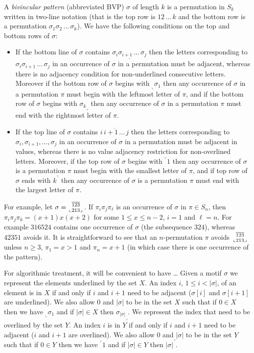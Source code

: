 \documentclass[a4paper]{llncs}
\newcommand{\pmotif}{\sigma}
\newcommand\BV[2]{\genfrac{}{}{0pt}{}{#1}{#2}}
\newcommand{\x}{X}
\newcommand{\y}{Y}
\begin{document}
A \emph{bivincular pattern} (abbreviated BVP) $\sigma$
of length $k$ is a permutation in $S_k$ written in
two-line notation
(that is the top row is $12\,\ldots\,k$ and the bottom row
is a permutation $\sigma_1\sigma_2\,\ldots\,\sigma_k$).
We have the following conditions on the top and bottom rows
of $\sigma$:
\begin{itemize}
	\item
	If the bottom line of $\sigma$ contains
	$\underline{\sigma_i\sigma_{i+1}\,\ldots\,\sigma_j}$
	then the letters corresponding to
	$\sigma_i\sigma_{i+1}\,\ldots\,\sigma_j$ in an occurrence of
	$\sigma$ in a permutation must be adjacent, whereas there is
	no adjacency condition for
	non-underlined consecutive letters.
	Moreover if the bottom row of $\sigma$ begins with
	$_\llcorner{\sigma_1}$ then any occurrence of $\sigma$
	in a permutation $\pi$ must begin with the leftmost
	letter of $\pi$,
	and
	if the bottom row of $\sigma$ begins with
	${\sigma_k}_\lrcorner$ then any occurrence of $\sigma$
	in a permutation $\pi$ must end with the rightmost
	letter of $\pi$.
	\item
	If the top line of $\sigma$ contains
	$\overline{i\,i+1\,\ldots\,j}$ then the letters corresponding to
	$\sigma_i, \sigma_{i+1}, \ldots, \sigma_j$ in an
	occurrence of $\sigma$ in a permutation must be adjacent in values,
	whereas there is no value adjacency restriction for non-overlined
	letters.
	Moreover, if the top row of $\sigma$ begins with
	$^\ulcorner{1}$ then
	any occurrence of $\sigma$ is a permutation $\pi$ must begin with
	the smallest letter of $\pi$, and
	if top row of $\sigma$ ends with $k^\urcorner$ then
	any occurrence of $\sigma$ is a permutation $\pi$ must end with
	the largest letter of $\pi$.
\end{itemize}

For example,
let
$\sigma = \BV{\overline{123}}{\llcorner 213 \lrcorner}$.
If $\pi_i\pi_j\pi_\ell$ is an occurrence of $\sigma$ in $\pi \in S_n$,
then $\pi_i\pi_j\pi_k = (x+1)x(x+2)$ for some $1 \leq x \leq n-2$,
$i=1$ and $\ell = n$.
For example $316524$ contains one occurrence of $\sigma$ (the subsequence $324$),
whereas $42351$ avoids it.
It is straightforward to see that an $n$-permutation
$\pi$ avoids $\BV{\overline{123}}{\llcorner 213 \lrcorner}$ unless
$n \geq 3$,
$\pi_1 = x > 1$
and $\pi_n = x+1$
(in which case there is one occurrence of the pattern).

For algorithmic treatment, it will be convenient to have \ldots
Given a motif $\pmotif$ we represent the elements underlined by the set $\x$. An index $i$, $1 \leq i < |\sigma|$, of an element is in $\x$ if and only if $i$ and $i+1$ need to be adjacent ($\pmotif[i]$ and $\pmotif[i+1]$ are underlined). We also allow $0$ and $|\sigma|$ to be in the set $\x$ such that if $0 \in \x$ then we have $_\llcorner{\sigma_1}$ and if $|\sigma| \in \x$ then ${\sigma_{|\sigma|}}_\lrcorner$.
We represent the index that need to be overlined by the set $\y$. An index $i$ is in $\y$ if and only if $i$ and $i+1$ need to be adjacent ($i$ and $i+1$ are overlined). We also allow $0$ and $|\sigma|$ to be in the set $\y$ such that if $0 \in \y$ then we have $^\ulcorner{1}$ and if $|\sigma| \in \y$ then ${|\sigma|}^\urcorner$.
\end{document}

